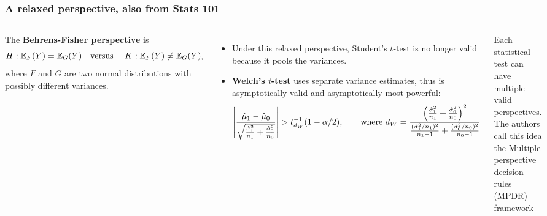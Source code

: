 \begin{frame}\frametitle{A relaxed perspective, also from Stats 101}
	\begin{columns}
		\vspace{-0.5em}
		\begin{per}
The \textbf{Behrens-Fisher perspective} is
	\vspace{-1em}
	\begin{equation*}\vspace{-1em}
		H:\mathbb{E}_F(Y)=\mathbb{E}_G(Y) \text{\quad versus \quad} K:\mathbb{E}_F(Y) \neq \mathbb{E}_G(Y),
	\end{equation*}
	where $F$ and $G$ are two \alert{normal} distributions with possibly \alert{different variances}. 
	\end{per}
	\begin{itemize}\vspace{-0.5em}
		\item Under this relaxed perspective, Student's $t$-test is no longer valid because it pools the variances.
		\item \textbf{Welch's $t$-test} uses separate variance estimates, thus is \alert{asymptotically valid} and \alert{asymptotically most powerful}:
		\vspace{-1.5em}
		\begin{equation*}
			\left| \frac{\hat\mu_1 - \hat\mu_0}{\sqrt{\frac{\hat\sigma^2_1}{n_1} + \frac{\hat\sigma^2_0}{n_0}}} \right|
			> t_{d_W}^{-1}(1-\alpha/2),
			\text{\quad\quad where }
			{\scriptsize
			d_W = \frac{\left(
				\frac{\hat\sigma^2_1}{n_1} + \frac{\hat\sigma^2_0}{n_0}
			\right)^2}{\frac{(\hat\sigma^2_1/n_1)^2}{n_1-1} + \frac{(\hat\sigma^2_0/n_0)^2}{n_0-1}}
		}
		\end{equation*}
\end{itemize}
\vspace{-1em}
\thus Each statistical test can have multiple valid perspectives. The authors call this idea the \alert{Multiple perspective decision rules (MPDR) framework}
	\end{columns}
\end{frame}


